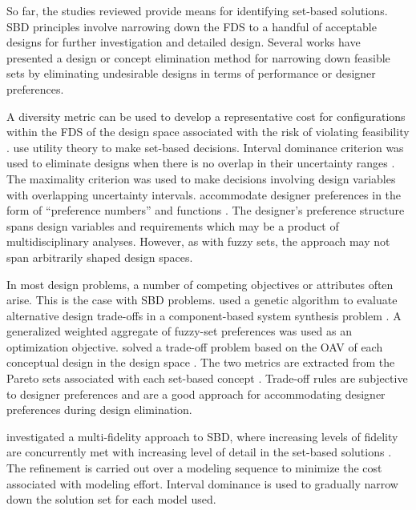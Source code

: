 So far, the studies reviewed provide means for identifying set-based solutions. \ac{SBD} principles involve narrowing down the \ac{FDS} to a handful of acceptable designs for further investigation and detailed design. Several works have presented a design or concept elimination method for narrowing down feasible sets by eliminating undesirable designs in terms of performance or designer preferences.

A diversity metric can be used to develop a representative cost for configurations within the \ac{FDS} of the design space associated with the risk of violating feasibility \cite{Doerry2014}. \citeauthor{Malak2009} use utility theory to make set-based decisions. Interval dominance criterion was used to eliminate designs when there is no overlap in their uncertainty ranges \cite{Malak2009}. The maximality criterion was used to make decisions involving design variables with overlapping uncertainty intervals. \citeauthor{Nahm2005} accommodate designer preferences in the form of ``preference numbers'' and functions \cite{Nahm2005}. The designer's preference structure spans design variables and requirements which may be a product of multidisciplinary analyses. However, as with fuzzy sets, the approach may not span arbitrarily shaped design spaces.

In most design problems, a number of competing objectives or attributes often arise. This is the case with \ac{SBD} problems. \citeauthor{Jiachuan2003} used a genetic algorithm to evaluate alternative design trade-offs in a component-based system synthesis problem \cite{Jiachuan2003}. A generalized weighted aggregate of fuzzy-set preferences was used as an optimization objective. \citeauthor{Avigad2009b} solved a trade-off problem based on the \ac{OAV} of each conceptual design in the design space \cite{Avigad2009b}. The two metrics are extracted from the Pareto sets associated with each set-based concept \cite{Avigad2009b}. Trade-off rules are subjective to designer preferences and are a good approach for accommodating designer preferences during design elimination.

\citeauthor{Miller2018} investigated a multi-fidelity approach to \ac{SBD}, where increasing levels of fidelity are concurrently met with increasing level of detail in the set-based solutions \cite{Miller2018}. The refinement is carried out over a modeling sequence to minimize the cost associated with modeling effort. Interval dominance is used to gradually narrow down the solution set for each model used.

